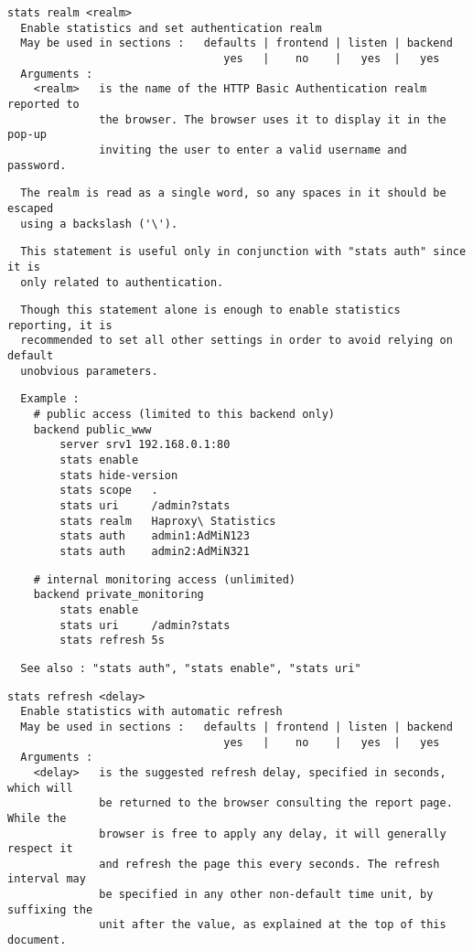 \begin{verbatim}
stats realm <realm>
  Enable statistics and set authentication realm
  May be used in sections :   defaults | frontend | listen | backend
                                 yes   |    no    |   yes  |   yes
  Arguments :
    <realm>   is the name of the HTTP Basic Authentication realm reported to
              the browser. The browser uses it to display it in the pop-up
              inviting the user to enter a valid username and password.
\end{verbatim}

\begin{verbatim}
  The realm is read as a single word, so any spaces in it should be escaped
  using a backslash ('\').
\end{verbatim}

\begin{verbatim}
  This statement is useful only in conjunction with "stats auth" since it is
  only related to authentication.
\end{verbatim}

\begin{verbatim}
  Though this statement alone is enough to enable statistics reporting, it is
  recommended to set all other settings in order to avoid relying on default
  unobvious parameters.
\end{verbatim}

\begin{verbatim}
  Example :
    # public access (limited to this backend only)
    backend public_www
        server srv1 192.168.0.1:80
        stats enable
        stats hide-version
        stats scope   .
        stats uri     /admin?stats
        stats realm   Haproxy\ Statistics
        stats auth    admin1:AdMiN123
        stats auth    admin2:AdMiN321
\end{verbatim}

\begin{verbatim}
    # internal monitoring access (unlimited)
    backend private_monitoring
        stats enable
        stats uri     /admin?stats
        stats refresh 5s
\end{verbatim}

\begin{verbatim}
  See also : "stats auth", "stats enable", "stats uri"
\end{verbatim}

\begin{verbatim}
stats refresh <delay>
  Enable statistics with automatic refresh
  May be used in sections :   defaults | frontend | listen | backend
                                 yes   |    no    |   yes  |   yes
  Arguments :
    <delay>   is the suggested refresh delay, specified in seconds, which will
              be returned to the browser consulting the report page. While the
              browser is free to apply any delay, it will generally respect it
              and refresh the page this every seconds. The refresh interval may
              be specified in any other non-default time unit, by suffixing the
              unit after the value, as explained at the top of this document.
\end{verbatim}

